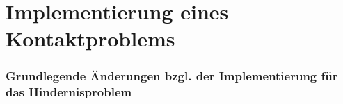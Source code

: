 \section{Implementierung eines Kontaktproblems}
\label{kap:5.2}

\subsubsection{Grundlegende Änderungen bzgl. der Implementierung für das Hindernisproblem}




\newpage

